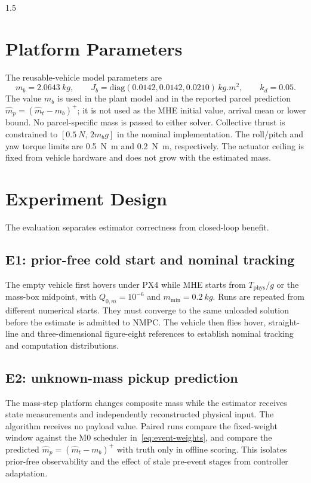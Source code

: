 \begin{spacing}{1.5}
\section{Platform Parameters}

The reusable-vehicle model parameters are
\begin{equation}
m_b=\SI{2.0643}{kg},\qquad
J_b=\mathrm{diag}(0.0142,0.0142,0.0210)\,\si{kg.m^2},\qquad
k_d=0.05.
\end{equation}
The value $m_b$ is used in the plant model and in the reported parcel
prediction $\hat m_p=(\hat m_t-m_b)^+$; it is not used as the MHE
initial value, arrival mean or lower bound. No parcel-specific mass is
passed to either solver. Collective thrust is constrained to
$[\SI{0.5}{N},\,2m_bg]$ in the nominal implementation. The roll/pitch
and yaw torque limits are \SI{0.5}{N.m} and \SI{0.2}{N.m},
respectively. The actuator ceiling is fixed from vehicle hardware and
does not grow with the estimated mass.

\section{Experiment Design}

The evaluation separates estimator correctness from closed-loop benefit.

\subsection{E1: prior-free cold start and nominal tracking}

The empty vehicle first hovers under PX4 while MHE starts from
$T_{\mathrm{phys}}/g$ or the mass-box midpoint, with
$Q_{0,m}=10^{-6}$ and $m_{\min}=\SI{0.2}{kg}$. Runs are repeated from
different numerical starts. They must converge to the same unloaded
solution before the estimate is admitted to NMPC. The vehicle then flies
hover, straight-line and three-dimensional figure-eight references to
establish nominal tracking and computation distributions.

\subsection{E2: unknown-mass pickup prediction}

The mass-step platform changes composite mass while the estimator receives
state measurements and independently reconstructed physical input. The
algorithm receives no payload value. Paired runs compare the fixed-weight
window against the M0 scheduler in~\eqref{eq:event-weights}, and compare
the predicted $\hat m_p=(\hat m_t-m_b)^+$ with truth only in offline
scoring. This isolates prior-free observability and the effect of stale
pre-event stages from controller adaptation.


\end{spacing}
